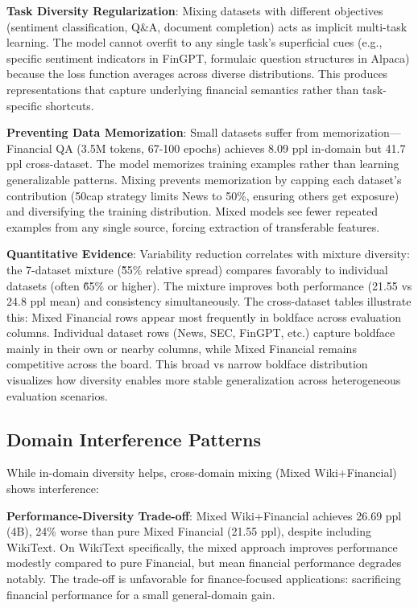 \textbf{Task Diversity Regularization}: Mixing datasets with different objectives (sentiment classification, Q\&A, document completion) acts as implicit multi-task learning. The model cannot overfit to any single task's superficial cues (e.g., specific sentiment indicators in FinGPT, formulaic question structures in Alpaca) because the loss function averages across diverse distributions. This produces representations that capture underlying financial semantics rather than task-specific shortcuts.

\textbf{Preventing Data Memorization}: Small datasets suffer from memorization—Financial QA (3.5M tokens, 67-100 epochs) achieves 8.09 ppl in-domain but 41.7 ppl cross-dataset. The model memorizes training examples rather than learning generalizable patterns. Mixing prevents memorization by capping each dataset's contribution (50cap strategy limits News to 50\%, ensuring others get exposure) and diversifying the training distribution. Mixed models see fewer repeated examples from any single source, forcing extraction of transferable features.

\textbf{Quantitative Evidence}: Variability reduction correlates with mixture diversity: the 7-dataset mixture (\~55\% relative spread) compares favorably to individual datasets (often \~65\% or higher). The mixture improves both performance (21.55 vs 24.8 ppl mean) and consistency simultaneously. The cross-dataset tables illustrate this: Mixed Financial rows appear most frequently in boldface across evaluation columns. Individual dataset rows (News, SEC, FinGPT, etc.) capture boldface mainly in their own or nearby columns, while Mixed Financial remains competitive across the board. This broad vs narrow boldface distribution visualizes how diversity enables more stable generalization across heterogeneous evaluation scenarios.

\subsection{Domain Interference Patterns}

While in-domain diversity helps, cross-domain mixing (Mixed Wiki+Financial) shows interference:

\textbf{Performance-Diversity Trade-off}: Mixed Wiki+Financial achieves 26.69 ppl (4B), 24\% worse than pure Mixed Financial (21.55 ppl), despite including WikiText. On WikiText specifically, the mixed approach improves performance modestly compared to pure Financial, but mean financial performance degrades notably. The trade-off is unfavorable for finance-focused applications: sacrificing financial performance for a small general-domain gain.

